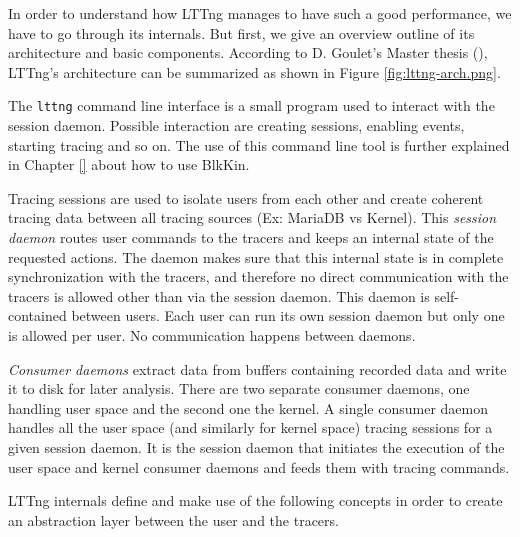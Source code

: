In order to understand how LTTng manages to have such a good performance, we
have to go through its internals. But first, we give an overview outline of its
architecture and basic components. According to D. Goulet's Master thesis
(\cite{goulet}), LTTng's architecture can be summarized as shown in Figure
\ref{fig:lttng-arch.png}.  


The \texttt{lttng} command line interface is a small program used to interact
with the session daemon. Possible interaction are creating sessions, enabling
events, starting tracing and so on. The use of this command line tool is further
explained in Chapter \ref{} about how to use BlkKin.

Tracing sessions are used to isolate users from each other and create coherent
tracing data between all tracing sources (Ex: MariaDB vs Kernel). This
\textit{session daemon} routes user commands to the tracers and keeps an
internal state of the requested actions. The daemon makes sure that this
internal state is in complete synchronization with the tracers, and therefore no
direct communication with the tracers is allowed other than via the session
daemon.  This daemon is self-contained between users. Each user can run its own
session daemon but only one is allowed per user. No communication happens
between daemons. 

\textit{Consumer daemons} extract data from buffers containing recorded data and
write it to disk for later analysis. There are two separate consumer daemons,
one handling user space and the second one the kernel. A single consumer daemon
handles all the user space (and similarly for kernel space) tracing sessions for
a given session daemon. It is the session daemon that initiates the execution of
the user space and kernel consumer daemons and feeds them with tracing commands.

LTTng internals define and make use of the following concepts in order to create
an abstraction layer between the user and the tracers.
 
